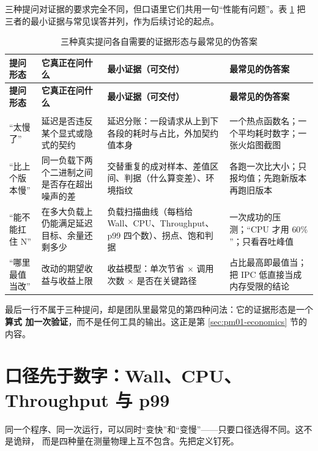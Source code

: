 \documentclass[12pt,a4paper,fontset=fandol]{ctexbook}
\newcommand{\Lang}[1]{\textsf{#1}}
\newcommand{\MWall}{\Lang{Wall}}
\newcommand{\MCpu}{\Lang{CPU}}
\newcommand{\MThr}{\Lang{Throughput}}
\newcommand{\Mx}[1]{\textsf{#1}}
\begin{document}
三种提问对证据的要求完全不同，但口语里它们共用一句``性能有问题''。表
\ref{tab:pm01-question} 把三者的最小证据与常见误答并列，作为后续讨论的起点。

\begin{longtable}{>{\raggedright\arraybackslash}p{}
                  >{\raggedright\arraybackslash}p{}
                  >{\raggedright\arraybackslash}p{}
                  >{\raggedright\arraybackslash}p{}}
\caption{三种真实提问各自需要的证据形态与最常见的伪答案}\label{tab:pm01-question}\\
\toprule
\textbf{提问形态} & \textbf{它真正在问什么} & \textbf{最小证据（可交付）}
& \textbf{最常见的伪答案}\\
\midrule
\endfirsthead
\toprule
\textbf{提问形态} & \textbf{它真正在问什么} & \textbf{最小证据（可交付）}
& \textbf{最常见的伪答案}\\
\midrule
\endhead
\midrule
\multicolumn{4}{r}{\footnotesize 接下页}\\
\endfoot
\bottomrule
\endlastfoot
``太慢了'' &
延迟是否违反某个显式或隐式的契约 &
延迟分账：一段请求从上到下各段的耗时与占比，外加契约值本身 &
一个热点函数名；一个平均耗时数字；一张火焰图截图\\
``比上个版本慢'' &
同一负载下两个二进制之间是否存在超出噪声的差 &
交替重复的成对样本、差值区间、判据（什么算变差）、环境指纹 &
各跑一次比大小；只报均值；先跑新版本再跑旧版本\\
``能不能扛住 N'' &
在多大负载上仍能满足延迟目标、余量还剩多少 &
负载扫描曲线（每档给 \MWall、\MCpu、\MThr、\Mx{p99} 四个数）、拐点、饱和判据 &
一次成功的压测；``CPU 才用 $60\%$''；只看吞吐峰值\\
``哪里最值当改'' &
改动的期望收益与收益上限 &
收益模型：单次节省 $\times$ 调用次数 $\times$ 是否在关键路径 &
占比最高即最值当；把 \Mx{IPC} 低直接当成内存受限的结论\\
\end{longtable}

最后一行不属于三种提问，却是团队里最常见的第四种问法：它的证据形态是一个\textbf{算式
加一次验证}，而不是任何工具的输出。这正是第 \ref{sec:pm01-economics} 节的内容。

\section{口径先于数字：\MWall、\MCpu、\MThr{} 与 \Mx{p99}}
\label{sec:pm01-metric}

同一个程序、同一次运行，可以同时``变快''和``变慢''——只要口径选得不同。这不是诡辩，
而是四种量在测量物理上互不包含。先把定义钉死。
\end{document}
